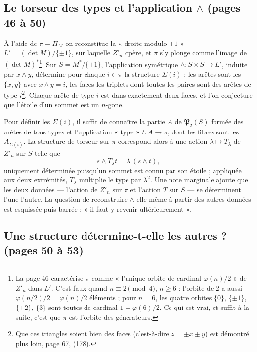 \documentclass[11pt,a4paper]{article}
\begin{document}
\subsection*{Le torseur des types et l'application $\wedge$ (pages 46 à 50)}

À l'aide de $\pi = \Pi_M$ on reconstitue la « droite modulo $\pm 1$ » $L' =
(\det M)/\{\pm 1\}$, sur laquelle $Z'_n$ opère, et $\pi$ s'y plonge comme
l'image de $(\det M)^{*}$\footnote{La page 46 caractérise $\pi$ comme
« l'unique orbite de cardinal $\varphi(n)/2$ » de $Z'_n$ dans $L'$. C'est faux
quand $n \equiv 2 \pmod 4$, $n \geq 6$ : l'orbite de $2$ a aussi
$\varphi(n/2)/2 = \varphi(n)/2$ éléments ; pour $n = 6$, les quatre orbites
$\{0\}$, $\{\pm 1\}$, $\{\pm 2\}$, $\{3\}$ sont toutes de cardinal $1 =
\varphi(6)/2$. Ce qui est vrai, et suffit à la suite, c'est que $\pi$ est
l'orbite des générateurs.}. Sur $S = M^{*}/\{\pm 1\}$, l'application symétrique
$\wedge : S \times S \to L'$, induite par $x \wedge y$, détermine pour chaque $i
\in \pi$ la structure $\Sigma(i)$ : les arêtes sont les $\{x, y\}$ avec $x \wedge
y = i$, les faces les triplets dont toutes les paires sont des arêtes de type
$i$\footnote{Que ces triangles soient bien des faces (c'est-à-dire $z = \pm x
\pm y$) est démontré plus loin, page 67, (178).}. Chaque arête de type $i$ est
dans exactement deux faces, et l'on conjecture que l'étoile d'un sommet est un
$n$-gone.

Pour définir les $\Sigma(i)$, il suffit de connaître la partie $A$ de
$\mathfrak{P}_2(S)$ formée des arêtes de tous types et l'application « type »
$t : A \to \pi$, dont les fibres sont les $A_{\Sigma(i)}$. La structure de
torseur sur $\pi$ correspond alors à une action $\lambda \mapsto T_\lambda$ de
$Z'_n$ sur $S$ telle que
\[
  s \wedge T_\lambda t = \lambda\,(s \wedge t) ,
\]
uniquement déterminée puisqu'un sommet est connu par son étoile ; appliquée aux
deux extrémités, $T_\lambda$ multiplie le type par $\lambda^2$. Une note
marginale ajoute que les deux données --- l'action de $Z'_n$ sur $\pi$ et
l'action $T$ sur $S$ --- se déterminent l'une l'autre. La question de
reconstruire $\wedge$ elle-même à partir des autres données est esquissée puis
barrée : « il faut y revenir ultérieurement ».

\subsection*{Une structure détermine-t-elle les autres ? (pages 50 à 53)}
\end{document}
